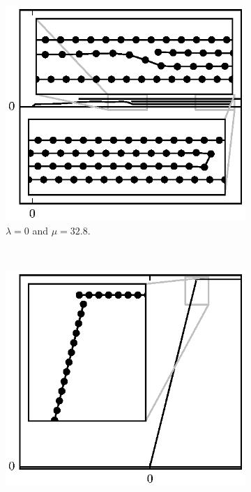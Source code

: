    \begin{figure}[t]
      \centering
      \begin{subfigure}{.5\textwidth}
         \centering
         \includegraphics{./fig/ch3/pull/eb0.1/l0_m32.8.eps}
         \caption{$\lambda=0$ and $\mu=32.8$. \label{subfig:folded_over}}
      \end{subfigure}%
      ~
      \begin{subfigure}{.5\textwidth}
         \centering
         \includegraphics{./fig/ch3/pull/eb0/t76_m4.eps}

\end{subfigure}
\end{figure}
